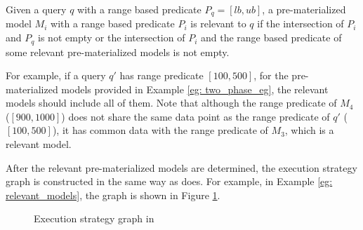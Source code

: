 Given a query $q$ with a range based predicate $P_q = [lb,ub]$, a pre-materialized model $M_i$ with a range based predicate $P_i$ is relevant to $q$ if the intersection of $P_i$ and $P_q$ is not empty or the intersection of $P_i$ and the range based predicate of some relevant pre-materialized models is not empty. 

\begin{example}\label{eg: relevant_models}
For example, if a query $q'$ has range predicate $[100, 500]$, for the pre-materialized models provided in Example \ref{eg: two_phase_eg}, the relevant models should include all of them. Note that although the range predicate of $M_4$ ($[900, 1000]$) does not share the same data point as the range predicate of $q'$ ($[100, 500]$), it has common data with the range predicate of $M_3$, which is a relevant model.
\end{example}

After the relevant pre-materialized models are determined, the execution strategy graph is constructed in the same way as \cite{hasani2018efficient} does. For example, in Example \ref{eg: relevant_models}, the graph is shown in Figure \ref{fig:min_cost_graph2}.

\begin{figure}[t]
\begin{center}
\end{center}
\caption{Execution strategy graph in \cite{gupta2015processing}}
\label{fig:min_cost_graph2}
\end{figure}

